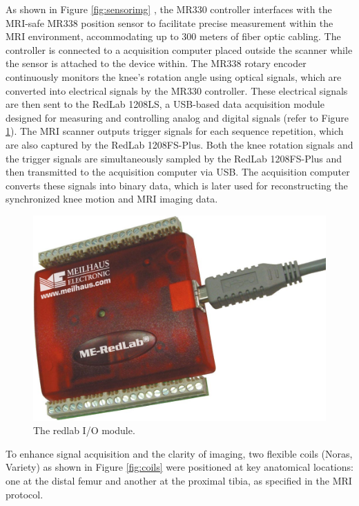 \documentclass{micro-econ-thesis}
\begin{document}
As shown in Figure \ref{fig:sensorimg} , the MR330 controller interfaces with the MRI-safe MR338 position sensor to facilitate precise measurement within the MRI environment, accommodating up to 300 meters of fiber optic cabling. The controller is connected to a acquisition computer placed outside the scanner while the sensor is attached to the device within. The MR338 rotary encoder continuously monitors the knee's rotation angle using optical signals, which are converted into electrical signals by the MR330 controller. These electrical signals are then sent to the RedLab 1208LS, a USB-based data acquisition module designed for measuring and controlling analog and digital signals (refer to Figure \ref{fig:redlab}). The MRI scanner outputs trigger signals for each sequence repetition, which are also captured by the RedLab 1208FS-Plus. Both the knee rotation signals and the trigger signals are simultaneously sampled by the RedLab 1208FS-Plus and then transmitted to the acquisition computer via USB. The acquisition computer converts these signals into binary data, which is later used for reconstructing the synchronized knee motion and MRI imaging data.  
\begin{figure}[H]
	\centering
	\includegraphics[scale=0.1]{redlab}
	\caption{The redlab I/O module.}
	\label{fig:redlab}
\end{figure}




To enhance signal acquisition and the clarity of imaging, two flexible coils (Noras, Variety) as shown in Figure \ref{fig:coils} were positioned at key anatomical locations: one at the distal femur and another at the proximal tibia, as specified in the MRI protocol. 
\end{document}
